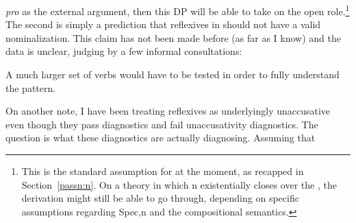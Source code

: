 \begin{exe}
\begin{xlist}
\begin{xlist}
\begin{exe}
\begin{xlist}
\begin{xlist}
\begin{exe}
\begin{xlist}
\begin{xlist}
\begin{exe}
\begin{exe}
\begin{xlist}
\begin{exe}
\begin{exe}
\begin{xlist}
\begin{exe}
\begin{exe}
\begin{exe}
\begin{exe}
\begin{exe}
\begin{xlist}
\begin{exe}
\begin{xlist}
\begin{exe}
\begin{exe}
\begin{xlist}
\begin{exe}
\begin{xlist}
\begin{exe}
\begin{xlist}
\begin{exe}
\begin{exe}
\begin{exe}
\begin{xlist}
\begin{exe}
\begin{exe}
\begin{exe}
\begin{xlist}
\begin{exe}
\begin{xlist}
\begin{exe}
\begin{exe}
\begin{xlist}
\begin{exe}
\begin{exe}
\begin{exe}
\begin{exe}
\begin{xlist}
\begin{exe}
\begin{xlist}
\begin{exe}
\begin{xlist}
\begin{exe}
\begin{xlist}
\begin{exe}
\begin{xlist}
\begin{exe}
\begin{xlist}
\begin{exe}
\begin{exe}
\begin{xlist}
\begin{exe}
\begin{xlist}
\begin{exe}
\begin{exe}
\begin{xlist}
\begin{exe}
\begin{xlist}
\begin{exe}
\begin{exe}
\begin{exe}
\begin{exe}
\begin{xlist}
\begin{xlist}
\begin{exe}
\begin{xlist}
\begin{exe}
\begin{exe}
\begin{exe}
\begin{xlist}
\begin{exe}
\begin{exe}
\begin{xlist}
\begin{exe}
\begin{exe}
\begin{exe}
\begin{xlist}
\begin{xlist}
\begin{exe}
\begin{xlist}
\begin{exe}
\begin{exe}
\begin{exe}
\begin{exe}
\begin{xlist}
\begin{exe}
\begin{xlist}
\begin{exe}
\begin{xlist}
\begin{exe}
\begin{xlist}
\begin{exe}
\begin{exe}
\begin{exe}
\begin{exe}
\emph{pro} as the external argument, then this DP will be able to take on the open  role.\footnote{This is the standard assumption for  at the moment, as recapped in Section~\ref{passn:n}. On a theory in which n existentially closes over the , the derivation might still be able to go through, depending on specific assumptions regarding Spec,n and the compositional semantics.} The second is simply a prediction that reflexives in {\thit} should not have a valid nominalization. This claim has not been made before (as far as I know) and the data is unclear, judging by a few informal consultations:

 \begin{exe}\judgewidth{\%}
 \ex  
 \begin{xlist} 
	
	
 \z
\z  
A much larger set of verbs would have to be tested in order to fully understand the pattern.

On another note, I have been treating reflexives as underlyingly unaccusative even though they pass  diagnostics and fail unaccusativity diagnostics. The question is what these diagnostics are actually diagnosing. Assuming that 
\end{xlist}
\end{exe}
\end{exe}
\end{exe}
\end{exe}
\end{exe}
\end{xlist}
\end{exe}
\end{xlist}
\end{exe}
\end{xlist}
\end{exe}
\end{xlist}
\end{exe}
\end{exe}
\end{exe}
\end{exe}
\end{xlist}
\end{exe}
\end{xlist}
\end{xlist}
\end{exe}
\end{exe}
\end{exe}
\end{xlist}
\end{exe}
\end{exe}
\end{xlist}
\end{exe}
\end{exe}
\end{exe}
\end{xlist}
\end{exe}
\end{xlist}
\end{xlist}
\end{exe}
\end{exe}
\end{exe}
\end{exe}
\end{xlist}
\end{exe}
\end{xlist}
\end{exe}
\end{exe}
\end{xlist}
\end{exe}
\end{xlist}
\end{exe}
\end{exe}
\end{xlist}
\end{exe}
\end{xlist}
\end{exe}
\end{xlist}
\end{exe}
\end{xlist}
\end{exe}
\end{xlist}
\end{exe}
\end{xlist}
\end{exe}
\end{exe}
\end{exe}
\end{exe}
\end{xlist}
\end{exe}
\end{exe}
\end{xlist}
\end{exe}
\end{xlist}
\end{exe}
\end{exe}
\end{exe}
\end{xlist}
\end{exe}
\end{exe}
\end{exe}
\end{xlist}
\end{exe}
\end{xlist}
\end{exe}
\end{xlist}
\end{exe}
\end{exe}
\end{xlist}
\end{exe}
\end{xlist}
\end{exe}
\end{exe}
\end{exe}
\end{exe}
\end{exe}
\end{xlist}
\end{exe}
\end{exe}
\end{xlist}
\end{exe}
\end{exe}
\end{xlist}
\end{xlist}
\end{exe}
\end{xlist}
\end{xlist}
\end{exe}
\end{xlist}
\end{xlist}
\end{exe}
